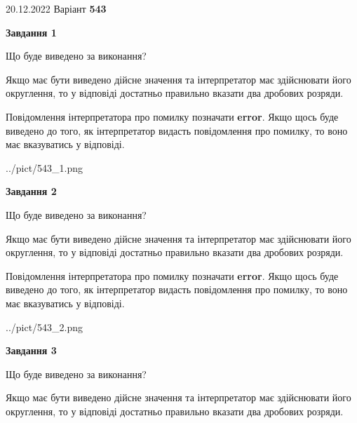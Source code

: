 \documentclass[12pt, ukrainian]{article}
\begin{document}
{20.12.2022 Варіант \No \textbf { 543 }\par}
{
\begin {Large}

{\begin {center}\textbf{Завдання 1}\end {center}}\par
Що буде виведено за виконання? \par

Якщо має бути виведено дійсне значення та інтерпретатор має здійснювати його округлення, 
то у відповіді достатньо правильно вказати два дробових розряди.

Повідомлення інтерпретатора про помилку позначати \textbf{error}.
Якщо щось буде виведено до того, як інтерпретатор видасть повідомлення про помилку, 
то воно має вказуватись у відповіді. \par

\begin{center}
	{../pict/543_1.png}
\end{center}
\newpage

{\begin {center}\textbf{Завдання 2}\end {center}}\par
Що буде виведено за виконання? \par

Якщо має бути виведено дійсне значення та інтерпретатор має здійснювати його округлення, 
то у відповіді достатньо правильно вказати два дробових розряди.

Повідомлення інтерпретатора про помилку позначати \textbf{error}.
Якщо щось буде виведено до того, як інтерпретатор видасть повідомлення про помилку, 
то воно має вказуватись у відповіді. \par

\begin{center}
	{../pict/543_2.png}
\end{center}
\newpage

{\begin {center}\textbf{Завдання 3}\end {center}}\par
Що буде виведено за виконання? \par

Якщо має бути виведено дійсне значення та інтерпретатор має здійснювати його округлення, 
то у відповіді достатньо правильно вказати два дробових розряди.


\end{Large}}
\end{document}
